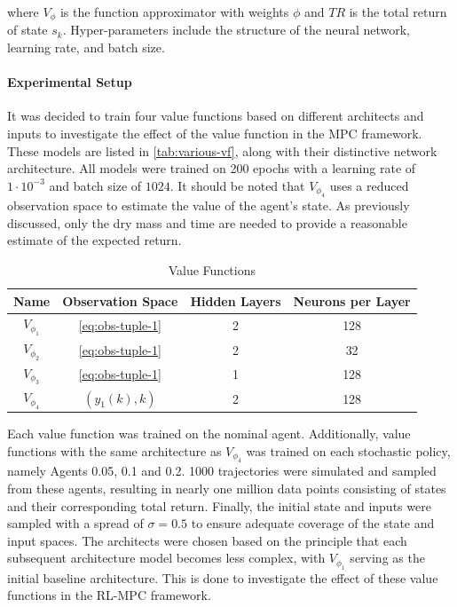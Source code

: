 where $V_{\phi}$ is the function approximator with weights $\phi$ and $TR$ is the total return of state $s_k$. Hyper-parameters include the structure of the neural network, learning rate, and batch size.\\



\paragraph{Experimental Setup}
It was decided to train four value functions based on different architects and inputs to investigate the effect of the value function in the MPC framework. These models are listed in \autoref{tab:various-vf}, along with their distinctive network architecture. All models were trained on 200 epochs with a learning rate of $1 \cdot 10^{-3}$ and batch size of $1024$. It should be noted that $V_{\phi_4}$ uses a reduced observation space to estimate the value of the agent's state. As previously discussed, only the dry mass and time are needed to provide a reasonable estimate of the expected return.

\begin{table}[H]
	\centering
	\renewcommand{\arraystretch}{1.3}
	\setlength{\tabcolsep}{12pt}
	\begin{tabular}{cccc}
		\toprule
		\textbf{Name} & \textbf{Observation Space} & \textbf{Hidden Layers} & \textbf{Neurons per Layer} \\
		\midrule
		$V_{\phi_1}$ & \autoref{eq:obs-tuple-1} & 2 & 128 \\  
		$V_{\phi_2}$ & \autoref{eq:obs-tuple-1} & 2 & 32 \\  
		$V_{\phi_3}$ & \autoref{eq:obs-tuple-1} & 1 & 128 \\  
		$V_{\phi_4}$ & $(y_1(k), k)$ & 2 & 128 \\  
		\bottomrule
	\end{tabular}
	\caption{Value Functions}
	\label{tab:various-vf}
\end{table}

Each value function was trained on the nominal agent. Additionally, value functions with the same architecture as $V_{\phi_4}$ was trained on each stochastic policy, namely Agents 0.05, 0.1 and 0.2. 1000 trajectories were simulated and sampled from these agents, resulting in nearly one million data points consisting of states and their corresponding total return. Finally, the initial state and inputs were sampled with a spread of $\sigma = 0.5$ to ensure adequate coverage of the state and input spaces. The architects were chosen based on the principle that each subsequent architecture model becomes less complex, with $V_{\phi_1}$ serving as the initial baseline architecture. This is done to investigate the effect of these value functions in the RL-MPC framework.

